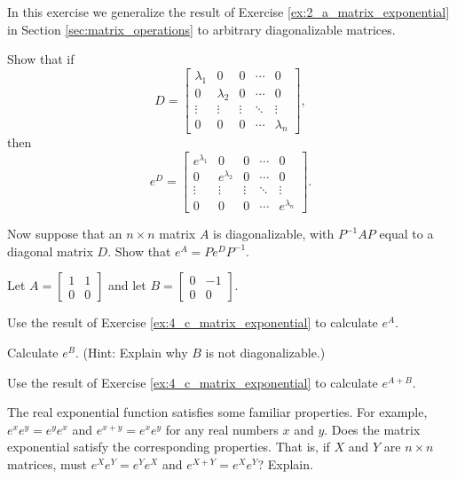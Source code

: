 \ea

\item  \label{ex:4_c_matrix_exponential} In this exercise we generalize the result of Exercise \ref{ex:2_a_matrix_exponential} in Section \ref{sec:matrix_operations} to arbitrary diagonalizable matrices. 
\ba
\item Show that if 
\[D=\left[ \begin{array}{ccccc} \lambda_1& 0 &0& \cdots &0 \\ 0 & \lambda_2& 0 &\cdots & 0 \\ \vdots &\vdots &\vdots & \ddots & \vdots \\ 0 & 0& 0 &\cdots & \lambda_n \end{array} \right],\]
then
\[e^D =  \left[ \begin{array}{ccccc} e^{\lambda_1}& 0 &0& \cdots &0 \\ 0 & e^{\lambda_2}& 0 &\cdots & 0 \\ \vdots &\vdots &\vdots & \ddots & \vdots \\ 0 & 0& 0 &\cdots & e^{\lambda_n} \end{array} \right].\]

\item Now suppose that an $n \times n$ matrix $A$ is diagonalizable, with $P^{-1}AP$ equal to a diagonal matrix $D$. Show that $e^A = Pe^DP^{-1}$. 

\ea

\item  \label{ex:4_c_matrix_exponential_examples} Let $A = \left[ \begin{array}{cc} 1&1\\0&0 \end{array} \right]$ and let $B = \left[ \begin{array}{cr} 0&-1 \\ 0&0 \end{array} \right]$.
\ba
\item Use the result of Exercise \ref{ex:4_c_matrix_exponential} to calculate $e^A$.

\item Calculate $e^B$. (Hint: Explain why $B$ is not diagonalizable.)

\item Use the result of Exercise \ref{ex:4_c_matrix_exponential} to calculate $e^{A+B}$.

\item The real exponential function satisfies some familiar properties. For example, $e^xe^y = e^ye^x$ and $e^{x+y} = e^x e^y$ for any real numbers $x$ and $y$. Does the matrix exponential satisfy the corresponding properties. That is, if $X$ and $Y$ are $n \times n$ matrices, must $e^Xe^Y = e^Ye^X$ and $e^{X+Y} = e^X e^Y$? Explain.

